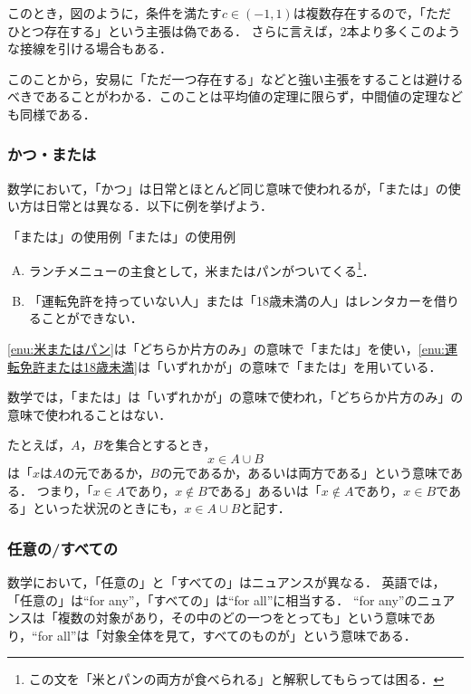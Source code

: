 \documentclass[a4paper,11pt]{ltjsarticle}
\begin{document}
このとき，図のように，条件を満たす$c \in (-1,1)$は複数存在するので，「ただひとつ存在する」という主張は偽である．
さらに言えば，2本より多くこのような接線を引ける場合もある．

このことから，安易に「ただ一つ存在する」などと強い主張をすることは避けるべきであることがわかる．このことは平均値の定理に限らず，中間値の定理なども同様である．


\subsubsection{かつ・または}



数学において，「かつ」は日常とほとんど同じ意味で使われるが，「または」の使い方は日常とは異なる．以下に例を挙げよう．

\begin{example}{「または」の使用例}{「または」の使用例}
  \begin{enumerate}[(A)]
    \item ランチメニューの主食として，米またはパンがついてくる\footnote{この文を「米とパンの両方が食べられる」と解釈してもらっては困る．}．\label{enu:米またはパン}
    \item 「運転免許を持っていない人」または「18歳未満の人」はレンタカーを借りることができない． \label{enu:運転免許または18歳未満}
  \end{enumerate}
  \ref{enu:米またはパン}は「どちらか片方のみ」の意味で「または」を使い，\ref{enu:運転免許または18歳未満}は「いずれかが」の意味で「または」を用いている．
\end{example}

数学では，「または」は「いずれかが」の意味で使われ，「どちらか片方のみ」の意味で使われることはない．

たとえば，$A$，$B$を集合とするとき，
\[
  x \in A \cup B
\]
は「$x$は$A$の元であるか，$B$の元であるか，あるいは両方である」という意味である．
つまり，「$ x \in A$であり，$x \notin  B$である」あるいは「$ x \notin A$であり，$x \in B$である」といった状況のときにも，$x \in A \cup B$と記す．

\subsubsection{任意の/すべての}

数学において，「任意の」と「すべての」はニュアンスが異なる．
英語では，「任意の」は``for any''，「すべての」は``for all''に相当する．
``for any''のニュアンスは「複数の対象があり，その中のどの一つをとっても」という意味であり，``for all''は「対象全体を見て，すべてのものが」という意味である．
\end{document}
